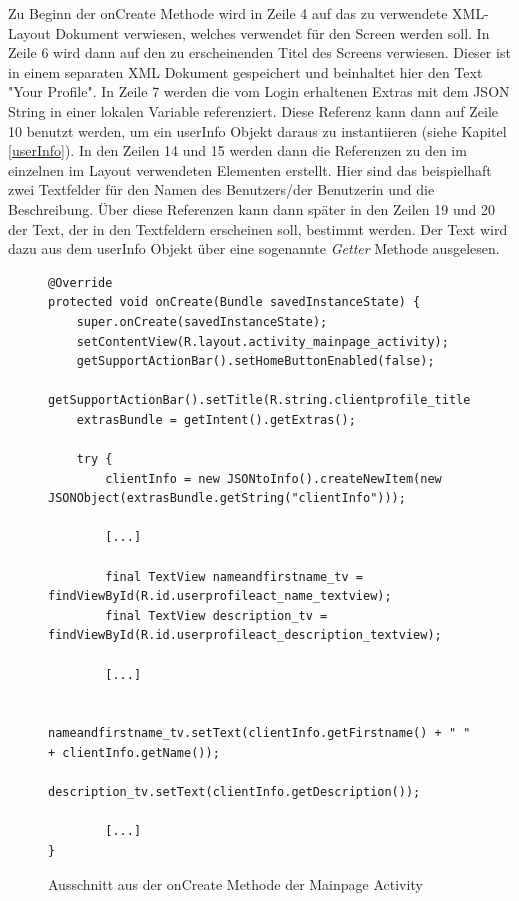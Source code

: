 \documentclass[a4paper,11pt]{report}
\begin{document}
			Zu Beginn der onCreate Methode wird in Zeile 4 auf das zu verwendete XML-Layout Dokument verwiesen, welches verwendet für den Screen werden soll. In Zeile 6 wird dann auf den zu erscheinenden Titel des Screens verwiesen. Dieser ist in einem separaten XML Dokument gespeichert und beinhaltet hier den Text "Your Profile". In Zeile 7 werden die vom Login erhaltenen Extras mit dem JSON String in einer lokalen Variable referenziert. Diese Referenz kann dann auf Zeile 10 benutzt werden, um ein userInfo Objekt daraus zu instantiieren (siehe Kapitel \ref{userInfo}). In den Zeilen 14 und 15 werden dann die Referenzen zu den im einzelnen im Layout verwendeten Elementen erstellt. Hier sind das beispielhaft zwei Textfelder für den Namen des Benutzers/der Benutzerin und die Beschreibung. Über diese Referenzen kann dann später in den Zeilen 19 und 20 der Text, der in den Textfeldern erscheinen soll, bestimmt werden. Der Text wird dazu aus dem userInfo Objekt über eine sogenannte \emph{Getter} Methode ausgelesen. 
\begin{figure}
	\begin{center}
		\begin{verbatim}
@Override
protected void onCreate(Bundle savedInstanceState) {
	super.onCreate(savedInstanceState);
	setContentView(R.layout.activity_mainpage_activity);
	getSupportActionBar().setHomeButtonEnabled(false);
	getSupportActionBar().setTitle(R.string.clientprofile_title);
	extrasBundle = getIntent().getExtras();
	
	try {
		clientInfo = new JSONtoInfo().createNewItem(new JSONObject(extrasBundle.getString("clientInfo")));
	
		[...]
	
		final TextView nameandfirstname_tv = findViewById(R.id.userprofileact_name_textview);
		final TextView description_tv = findViewById(R.id.userprofileact_description_textview);
	
		[...]
	
		nameandfirstname_tv.setText(clientInfo.getFirstname() + " " + clientInfo.getName());
		description_tv.setText(clientInfo.getDescription());
	
		[...]
}
		\end{verbatim}
	\caption{Ausschnitt aus der onCreate Methode der Mainpage Activity}\label{java:onCreate}
	\end{center}

\end{figure}
		
\end{document}
